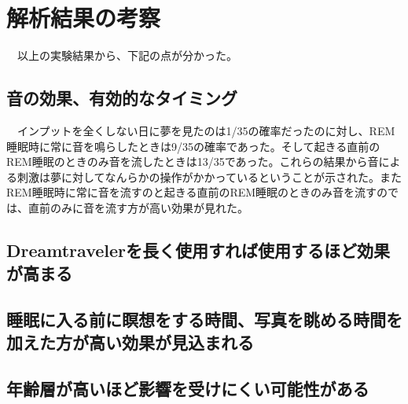 \section{解析結果の考察}
　以上の実験結果から、下記の点が分かった。

\subsection{音の効果、有効的なタイミング}
　インプットを全くしない日に夢を見たのは1/35の確率だったのに対し、REM睡眠時に常に音を鳴らしたときは9/35の確率であった。そして起きる直前のREM睡眠のときのみ音を流したときは13/35であった。これらの結果から音による刺激は夢に対してなんらかの操作がかかっているということが示された。またREM睡眠時に常に音を流すのと起きる直前のREM睡眠のときのみ音を流すのでは、直前のみに音を流す方が高い効果が見れた。

\subsection{Dreamtravelerを長く使用すれば使用するほど効果が高まる}

\subsection{睡眠に入る前に瞑想をする時間、写真を眺める時間を加えた方が高い効果が見込まれる}

\subsection{年齢層が高いほど影響を受けにくい可能性がある}